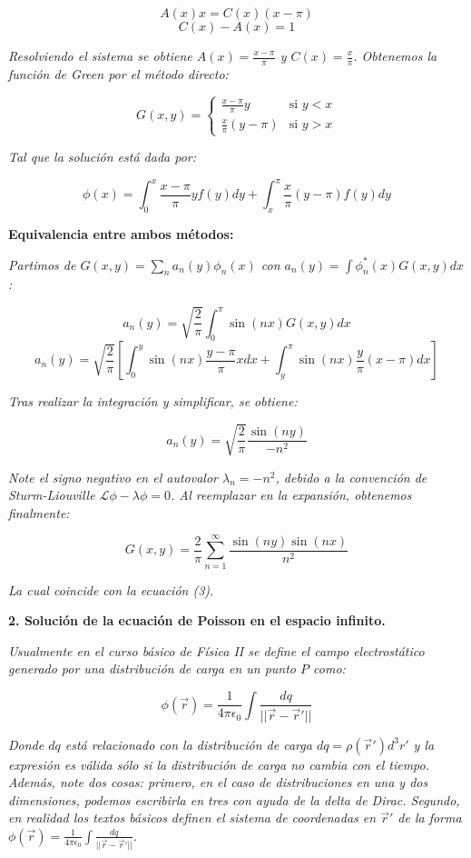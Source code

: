 \documentclass[a4paper]{article}
\begin{document}
$$ A(x)x = C(x)(x - \pi) $$
$$ C(x) - A(x) = 1 $$

\textit{Resolviendo el sistema se obtiene $A(x) = \frac{x - \pi}{\pi}$ y $C(x) = \frac{x}{\pi}$. Obtenemos la función de Green por el método directo:}

$$ G(x, y) = \begin{cases} \frac{x - \pi}{\pi} y & \text{si } y < x \\ \frac{x}{\pi} (y - \pi) & \text{si } y > x \end{cases} $$

\textit{Tal que la solución está dada por:}

$$ \phi(x) = \int_0^x \frac{x - \pi}{\pi} y f(y) dy + \int_x^\pi \frac{x}{\pi} (y - \pi) f(y) dy $$

\textbf{Equivalencia entre ambos métodos:}

\textit{Partimos de $G(x, y) = \sum_n a_n(y)\phi_n(x)$ con $a_n(y) = \int \phi_n^*(x) G(x, y) dx$:}

$$ a_n(y) = \sqrt{\frac{2}{\pi}} \int_0^\pi \sin(nx) G(x, y) dx $$
$$ a_n(y) = \sqrt{\frac{2}{\pi}} \left[ \int_0^y \sin(nx) \frac{y - \pi}{\pi} x dx + \int_y^\pi \sin(nx) \frac{y}{\pi} (x - \pi) dx \right] $$

\textit{Tras realizar la integración y simplificar, se obtiene:}

$$ a_n(y) = \sqrt{\frac{2}{\pi}} \frac{\sin(ny)}{-n^2} $$

\textit{Note el signo negativo en el autovalor $\lambda_n = -n^2$, debido a la convención de Sturm-Liouville $\mathscr{L}\phi - \lambda\phi = 0$. Al reemplazar en la expansión, obtenemos finalmente:}

$$ G(x, y) = \frac{2}{\pi} \sum_{n=1}^\infty \frac{\sin(ny) \sin(nx)}{n^2} $$

\textit{La cual coincide con la ecuación (3).}


\textbf{2. Solución de la ecuación de Poisson en el espacio infinito.}

\textit{Usualmente en el curso básico de Física II se define el campo electrostático generado por una distribución de carga en un punto $P$ como:}

$$ \phi(\vec{r}) = \frac{1}{4\pi\epsilon_0} \int \frac{dq}{||\vec{r} - \vec{r}'||} $$

\textit{Donde $dq$ está relacionado con la distribución de carga $dq = \rho(\vec{r}')d^3r'$ y la expresión es válida sólo si la distribución de carga no cambia con el tiempo. Además, note dos cosas: primero, en el caso de distribuciones en una y dos dimensiones, podemos escribirla en tres con ayuda de la delta de Dirac. Segundo, en realidad los textos básicos definen el sistema de coordenadas en $\vec{r}'$ de la forma $\phi(\vec{r}) = \frac{1}{4\pi\epsilon_0} \int \frac{dq}{||\vec{r} - \vec{r}'||}$.}
\end{document}
